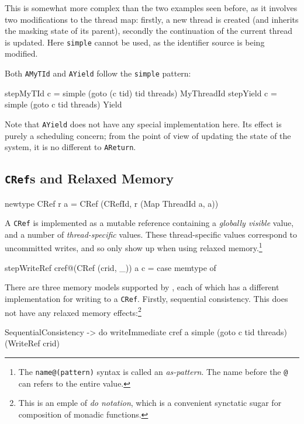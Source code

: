 This is somewhat more complex than the two examples seen before, as it
involves two modifications to the thread map: firstly, a new thread is
created (and inherits the masking state of its parent), secondly the
continuation of the current thread is updated. Here \verb|simple|
cannot be used, as the identifier source is being modified.

Both \verb|AMyTId| and \verb|AYield| follow the \verb|simple| pattern:

\begin{haskellcode}
stepMyTId c = simple (goto (c tid) tid threads) MyThreadId
stepYield c = simple (goto c tid threads) Yield
\end{haskellcode}

Note that \verb|AYield| does not have any special implementation
here. Its effect is purely a scheduling concern; from the point of
view of updating the state of the system, it is no different to
\verb|AReturn|.

\subsection{\texttt{CRef}s and Relaxed Memory}
\label{sec:execution-stepwise-cref}

\begin{haskellcode}
newtype CRef r a = CRef (CRefId, r (Map ThreadId a, a))
\end{haskellcode}

A \verb|CRef| is implemented as a mutable reference containing a
\emph{globally visible} value, and a number of \emph{thread-specific}
values. These thread-specific values correspond to uncommitted writes,
and so only show up when using relaxed memory.\footnote{The
  \texttt{name@(pattern)} syntax is called an \emph{as-pattern}. The
  name before the \texttt{@} can refers to the entire value.}

\begin{haskellcode}
stepWriteRef cref@(CRef (crid, _)) a c = case memtype of
\end{haskellcode}

There are three memory models supported by \dejafu{}, each of which
has a different implementation for writing to a \verb|CRef|. Firstly,
sequential consistency. This does not have any relaxed memory
effects:\footnote{This is an emple of \emph{do notation}, which is a
  convenient synctatic sugar for composition of monadic functions.}

\begin{haskellcode}
  SequentialConsistency -> do
    writeImmediate cref a
    simple (goto c tid threads) (WriteRef crid)
\end{haskellcode}


